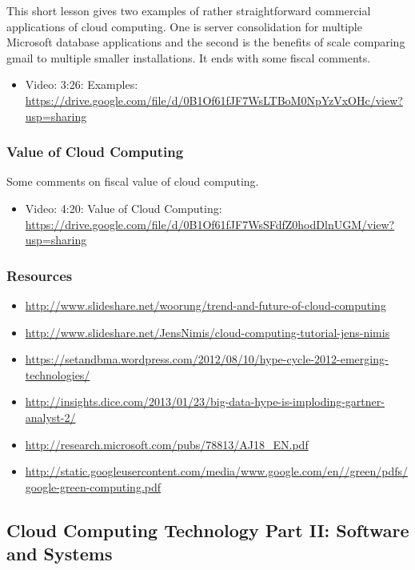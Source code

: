 This short lesson gives two examples of rather straightforward
commercial applications of cloud computing. One is server consolidation
for multiple Microsoft database applications and the second is the
benefits of scale comparing gmail to multiple smaller installations. It
ends with some fiscal comments.

\begin{itemize}
\item
  Video: 3:26: Examples:
  \url{https://drive.google.com/file/d/0B1Of61fJF7WsLTBoM0NpYzVxOHc/view?usp=sharing}
\end{itemize}

\subsubsection{Value of Cloud Computing}\label{value-of-cloud-computing}

Some comments on fiscal value of cloud computing.

\begin{itemize}
\item
  Video: 4:20: Value of Cloud Computing:
  \url{https://drive.google.com/file/d/0B1Of61fJF7WsSFdfZ0hodDlnUGM/view?usp=sharing}
\end{itemize}

\subsubsection{Resources}\label{resources-1}

\begin{itemize}
\tightlist
\item
  \url{http://www.slideshare.net/woorung/trend-and-future-of-cloud-computing}
\item
  \url{http://www.slideshare.net/JensNimis/cloud-computing-tutorial-jens-nimis}
\item
  \url{https://setandbma.wordpress.com/2012/08/10/hype-cycle-2012-emerging-technologies/}
\item
  \url{http://insights.dice.com/2013/01/23/big-data-hype-is-imploding-gartner-analyst-2/}
\item
  \url{http://research.microsoft.com/pubs/78813/AJ18_EN.pdf}
\item
  \url{http://static.googleusercontent.com/media/www.google.com/en//green/pdfs/google-green-computing.pdf}
\end{itemize}

\subsection{Cloud Computing Technology Part II: Software and Systems}

